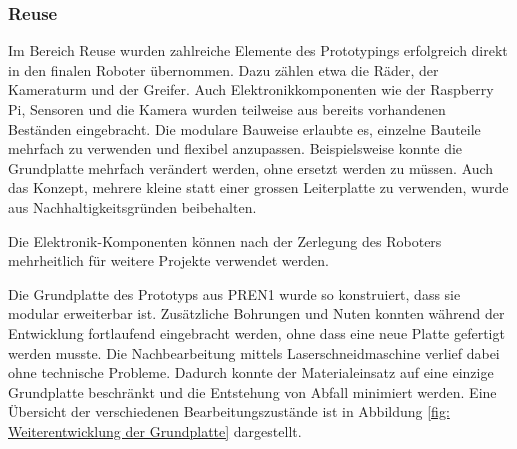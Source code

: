 \subsubsection{Reuse}

Im Bereich Reuse wurden zahlreiche Elemente des Prototypings erfolgreich direkt in den finalen Roboter übernommen. Dazu zählen etwa die Räder, der Kameraturm und der Greifer. Auch Elektronikkomponenten wie der Raspberry Pi, Sensoren und die Kamera wurden teilweise aus bereits vorhandenen Beständen eingebracht. Die modulare Bauweise erlaubte es, einzelne Bauteile mehrfach zu verwenden und flexibel anzupassen. Beispielsweise konnte die Grundplatte mehrfach verändert werden, ohne ersetzt werden zu müssen. Auch das Konzept, mehrere kleine statt einer grossen Leiterplatte zu verwenden, wurde aus Nachhaltigkeitsgründen beibehalten.

Die Elektronik-Komponenten können nach der Zerlegung des Roboters mehrheitlich für weitere Projekte verwendet werden.

Die Grundplatte des Prototyps aus PREN1 wurde so konstruiert, dass sie modular erweiterbar ist. Zusätzliche Bohrungen und Nuten konnten während der Entwicklung fortlaufend eingebracht werden, ohne dass eine neue Platte gefertigt werden musste. Die Nachbearbeitung mittels Laserschneidmaschine verlief dabei ohne technische Probleme. Dadurch konnte der Materialeinsatz auf eine einzige Grundplatte beschränkt und die Entstehung von Abfall minimiert werden. Eine Übersicht der verschiedenen Bearbeitungszustände ist in Abbildung \ref{fig: Weiterentwicklung der Grundplatte} dargestellt.

